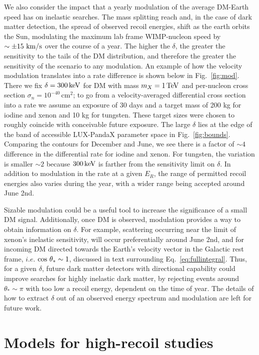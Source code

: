 \documentclass[11pt]{article}
\newcommand{\tev}{{\rm TeV}}
\newcommand{\kev}{{\rm keV}}
\begin{document}
We also consider the impact that a yearly modulation of the average DM-Earth speed has on inelastic searches. The mass splitting reach and, in the case of dark matter detection, the spread of observed recoil energies, shift as the earth orbits the Sun, modulating the maximum lab frame WIMP-nucleon speed by $\sim \pm15~{\rm km/s}$ over the course of a year.  The higher the $\delta$, the greater the sensitivity to the tails of the DM distribution, and therefore the greater the sensitivity of the scenario to any modulation. An example of how the velocity modulation translates into a rate difference is shown below in Fig.~\ref{fig:mod}. There we fix $\delta = 300\, \kev$ for DM with mass $m_X  = 1\, \tev$ and per-nucleon cross section $\sigma_n = 10^{-40}\, \text{cm}^2$; to go from a velocity-averaged differential cross section into a rate we assume an exposure of 30 days and a target mass of 200 kg for iodine and xenon and 10 kg for tungsten. These target sizes were chosen to roughly coincide with conceivable future exposure. The large $\delta$ lies at the edge of the band of accessible LUX-PandaX parameter space in Fig.~\ref{fig:bounds}. Comparing the contours for December and June, we see there is a factor of $\sim4$ difference in the differential rate for iodine and xenon. For tungsten, the variation is smaller $\sim2$ because $300\, \kev$ is farther from the sensitivity limit on $\delta$. In addition to modulation in the rate at a given $E_R$, the range of permitted recoil energies also varies during the year, with a wider range being accepted around June 2nd.

Sizable modulation could be a useful tool to increase the significance of a small DM signal. Additionally, once DM is observed, modulation provides a way to obtain information on $\delta$.  For example, scattering occurring near the limit of xenon's inelastic sensitivity, will occur preferentially around June 2nd, and for incoming DM directed towards the Earth's velocity vector in the Galactic rest frame, $i.e.$ ${\rm cos} ~\theta_* \sim 1$, discussed in text surrounding Eq.~\eqref{eq:fullintegral}.  Thus, for a given $\delta$, future dark matter detectors with directional capability could improve searches for highly inelastic dark matter, by rejecting events around $\theta_* \sim \pi$ with too low a recoil energy, dependent on the time of year.  The details of how to extract $\delta$ out of an observed energy spectrum and modulation are left for future work.


\section{Models for high-recoil studies}
\label{sec:models}
\end{document}
